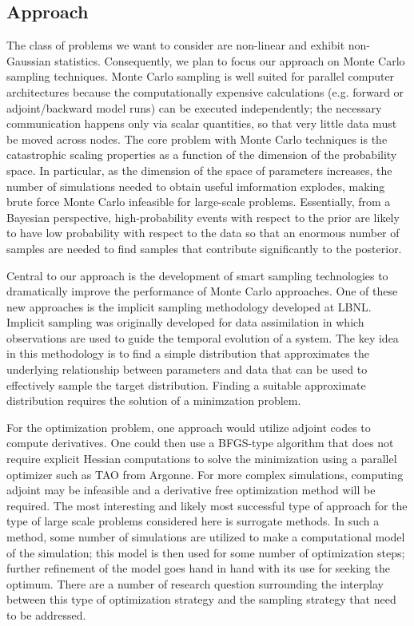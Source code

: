 \documentclass[11pt]{article}
\begin{document}
\subsection*{Approach}

The class of problems we want to consider are non-linear and exhibit non-Gaussian statistics.
Consequently, we plan to focus our approach on Monte Carlo sampling techniques.
Monte Carlo sampling is well suited for parallel computer architectures because the computationally
expensive calculations (e.g. forward or adjoint/backward model runs) can be executed independently;
the necessary communication happens only via scalar quantities, so that very little data must be moved
across nodes.
The core problem with Monte Carlo techniques is the catastrophic scaling properties as a function of the
dimension of the probability space.  In particular, as the dimension of the space of parameters increases,
the number of simulations needed to obtain useful imformation explodes, making brute force Monte Carlo
infeasible for large-scale problems.
Essentially, from a Bayesian perspective, high-probability events with respect to the prior are likely
to have low probability with respect to the data so that an enormous number of samples are needed to
find samples that contribute significantly to the posterior.

Central to our approach is the development of smart sampling technologies to dramatically improve
the performance of Monte Carlo approaches.
One of these new approaches is the implicit sampling methodology developed at LBNL.
Implicit sampling was originally developed for data assimilation in which observations are used
to guide the temporal evolution of a system.  The key idea in this methodology is to find a simple distribution
that approximates the underlying relationship between parameters and data that can be used to
effectively sample the target distribution.  Finding a suitable approximate distribution requires
the solution of a minimzation problem.

For the optimization problem, one approach would utilize adjoint codes to compute derivatives.
One could then use a BFGS-type algorithm that does not require explicit Hessian computations to
solve the minimization
using a parallel optimizer such as TAO from Argonne.
For more complex simulations, computing adjoint may be infeasible and a derivative free optimization
method will be required.
The most interesting and likely most successful type of approach
for the type of large scale problems considered here is
surrogate methods.  In such a method, some number of simulations are utilized to make
a computational model of the simulation; this model is then 
used for some number of optimization steps;  further refinement of the model goes hand in hand
with its use for seeking the optimum.
There are a number of research question surrounding the interplay between this type of optimization
strategy and the sampling strategy that need to be addressed.
\end{document}
